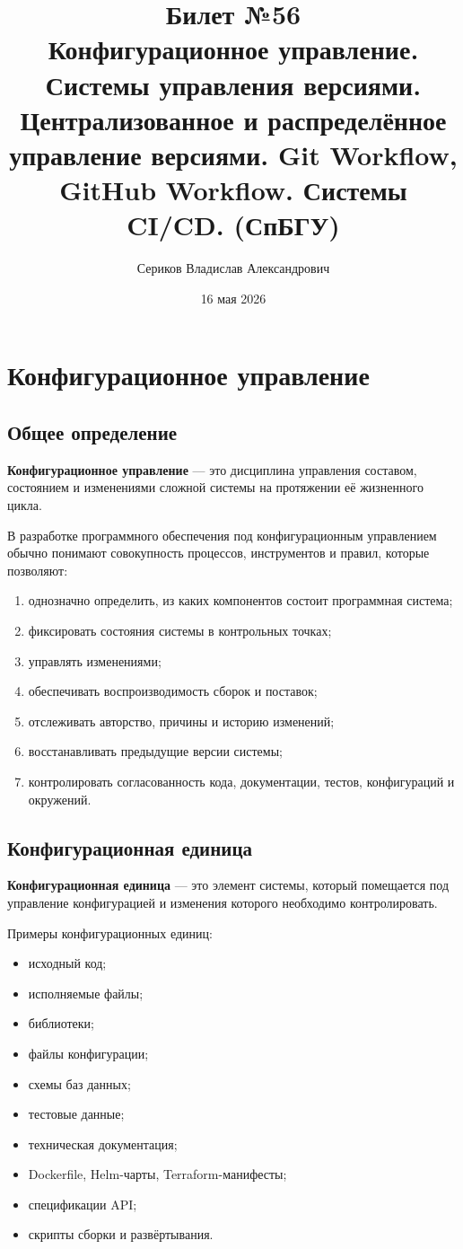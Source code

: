 \documentclass[12pt,a4paper]{article}
\title{Билет №56 \\ \small Конфигурационное управление. Системы управления версиями. Централизованное и распределённое управление версиями. Git Workflow, GitHub Workflow. Системы CI/CD. (СпБГУ)}
\author{Сериков Владислав Александрович}
\date{16 мая 2026}
\begin{document}
\maketitle
\tableofcontents
\newpage

\section{Конфигурационное управление}

\subsection{Общее определение}

\textbf{Конфигурационное управление} --- это дисциплина управления составом, состоянием и изменениями сложной системы на протяжении её жизненного цикла.

В разработке программного обеспечения под конфигурационным управлением обычно понимают совокупность процессов, инструментов и правил, которые позволяют:

\begin{enumerate}
    \item однозначно определить, из каких компонентов состоит программная система;
    \item фиксировать состояния системы в контрольных точках;
    \item управлять изменениями;
    \item обеспечивать воспроизводимость сборок и поставок;
    \item отслеживать авторство, причины и историю изменений;
    \item восстанавливать предыдущие версии системы;
    \item контролировать согласованность кода, документации, тестов, конфигураций и окружений.
\end{enumerate}

\subsection{Конфигурационная единица}

\textbf{Конфигурационная единица} --- это элемент системы, который помещается под управление конфигурацией и изменения которого необходимо контролировать.

Примеры конфигурационных единиц:

\begin{itemize}
    \item исходный код;
    \item исполняемые файлы;
    \item библиотеки;
    \item файлы конфигурации;
    \item схемы баз данных;
    \item тестовые данные;
    \item техническая документация;
    \item Dockerfile, Helm-чарты, Terraform-манифесты;
    \item спецификации API;
    \item скрипты сборки и развёртывания.
\end{itemize}
\end{document}
